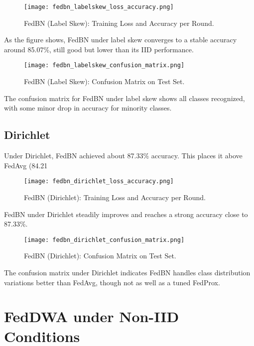 \documentclass[12pt,a4paper]{report}
\begin{document}
\begin{figure}[H]
	\centering
	\texttt{[image: fedbn\_labelskew\_loss\_accuracy.png]}
	\caption{FedBN (Label Skew): Training Loss and Accuracy per Round.}
\end{figure}

As the figure shows, FedBN under label skew converges to a stable accuracy around 85.07\%, still good but lower than its IID performance.

\begin{figure}[H]
	\centering
	\texttt{[image: fedbn\_labelskew\_confusion\_matrix.png]}
	\caption{FedBN (Label Skew): Confusion Matrix on Test Set.}
\end{figure}

The confusion matrix for FedBN under label skew shows all classes recognized, with some minor drop in accuracy for minority classes.

\subsection{Dirichlet}
Under Dirichlet, FedBN achieved about 87.33\% accuracy. This places it above FedAvg (84.21%

\begin{figure}[H]
	\centering
	\texttt{[image: fedbn\_dirichlet\_loss\_accuracy.png]}
	\caption{FedBN (Dirichlet): Training Loss and Accuracy per Round.}
\end{figure}

FedBN under Dirichlet steadily improves and reaches a strong accuracy close to 87.33\%.

\begin{figure}[H]
	\centering
	\texttt{[image: fedbn\_dirichlet\_confusion\_matrix.png]}
	\caption{FedBN (Dirichlet): Confusion Matrix on Test Set.}
\end{figure}

The confusion matrix under Dirichlet indicates FedBN handles class distribution variations better than FedAvg, though not as well as a tuned FedProx.

\section{FedDWA under Non-IID Conditions}
\end{document}
